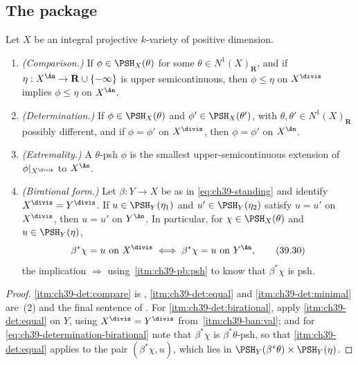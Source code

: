 \subsection{The package}
\label{sec:ch39-determination-package}

\begin{proposition}
\label{prop:ch39-determination-package}
Let $X$ be an integral projective $k$-variety of positive dimension.
\begin{enumerate}
\item\label{itm:ch39-det:compare}
 \emph{(Comparison.)}  If $\phi\in\PSH_X(\theta)$ for some
 $\theta\in N^1(X)_{\mathbf R}$, and if
 $\eta:X^{\An}\to\mathbf R\cup\{-\infty\}$ is upper semicontinuous, then
 $\phi\le\eta$ on $X^{\divis}$ implies $\phi\le\eta$ on $X^{\An}$.
\item\label{itm:ch39-det:equal}
 \emph{(Determination.)}  If $\phi\in\PSH_X(\theta)$ and
 $\phi'\in\PSH_X(\theta')$, with $\theta,\theta'\in N^1(X)_{\mathbf R}$
 possibly different, and if $\phi=\phi'$ on $X^{\divis}$, then
 $\phi=\phi'$ on $X^{\An}$.
\item\label{itm:ch39-det:minimal}
 \emph{(Extremality.)}  A $\theta$-psh $\phi$ is the smallest
 upper-semicontinuous extension of $\phi|_{X^{\divis}}$ to $X^{\An}$.
\item\label{itm:ch39-det:birational}
 \emph{(Birational form.)}  Let $\beta:Y\to X$ be as in
 \eqref{eq:ch39-standing} and identify $X^{\divis}=Y^{\divis}$.  If
 $u\in\PSH_Y(\eta_1)$ and $u'\in\PSH_Y(\eta_2)$ satisfy $u=u'$ on
 $X^{\divis}$, then $u=u'$ on $Y^{\An}$.  In particular, for
 $\chi\in\PSH_X(\theta)$ and $u\in\PSH_Y(\eta)$,
\[
 \beta^*\chi=u\ \text{on }X^{\divis}
 \iff
 \beta^*\chi=u\ \text{on }Y^{\An},
\tag{39.30}\label{eq:ch39-determination-birational}
\]
 the implication $\Rightarrow$ using
 \,\cref{itm:ch39-pb:psh} to know that
 $\beta^*\chi$ is psh.
\end{enumerate}
\end{proposition}

\begin{proof}
\cref{itm:ch39-det:compare} is ,
\cref{itm:ch39-det:equal} and \cref{itm:ch39-det:minimal} are
\,(2) and the final sentence of
.  For
\cref{itm:ch39-det:birational}, apply \cref{itm:ch39-det:equal} on $Y$,
using $X^{\divis}=Y^{\divis}$ from
\,\cref{itm:ch39-ban:val}; and for
\eqref{eq:ch39-determination-birational} note that $\beta^*\chi$ is
$\beta^*\theta$-psh, so that \cref{itm:ch39-det:equal} applies to the pair
$(\beta^*\chi,u)$, which lies in $\PSH_Y(\beta^*\theta)\times
\PSH_Y(\eta)$.
\end{proof}

